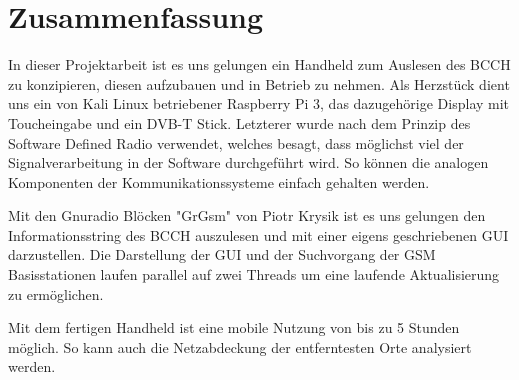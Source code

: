 %
%
\chapter{Zusammenfassung}

In dieser Projektarbeit ist es uns gelungen ein Handheld zum Auslesen des BCCH zu konzipieren, diesen aufzubauen und in Betrieb zu nehmen. Als Herzstück dient uns ein von Kali Linux betriebener Raspberry Pi 3, das dazugehörige Display mit Toucheingabe und ein DVB-T Stick. Letzterer wurde nach dem Prinzip des Software Defined Radio verwendet, welches besagt, dass möglichst viel der Signalverarbeitung in der Software durchgeführt wird. So können die analogen Komponenten der Kommunikationssysteme einfach gehalten werden.

Mit den Gnuradio Blöcken "GrGsm" von Piotr Krysik ist es uns gelungen den Informationsstring des BCCH auszulesen und mit einer eigens geschriebenen GUI darzustellen. Die Darstellung der GUI und der Suchvorgang der GSM Basisstationen laufen parallel auf zwei Threads um eine laufende Aktualisierung zu ermöglichen.

Mit dem fertigen Handheld ist eine mobile Nutzung von bis zu 5 Stunden möglich. So kann auch die Netzabdeckung der entferntesten Orte analysiert werden.